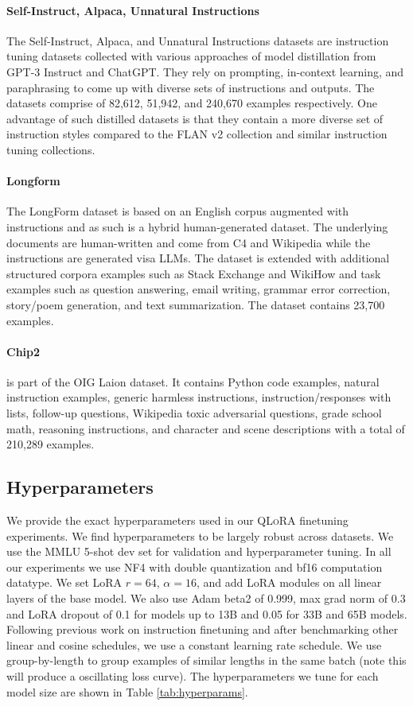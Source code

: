 \documentclass{article}
\newcommand{\method}{\textsc{QLoRA}\xspace}
\newcommand{\doublequant}{double quantization\xspace}
\begin{document}
\paragraph{Self-Instruct, Alpaca, Unnatural Instructions} The Self-Instruct, Alpaca, and Unnatural Instructions  datasets \citep{wang2022self, alpaca, honovich2022unnatural} are instruction tuning datasets collected with various approaches of model distillation from GPT-3 Instruct and ChatGPT. They rely on prompting, in-context learning, and paraphrasing to come up with diverse sets of instructions and outputs. The datasets comprise of 82,612, 51,942, and 240,670 examples respectively. One advantage of such distilled datasets is that they contain a more diverse set of instruction styles compared to the FLAN v2 collection and similar instruction tuning collections.
\paragraph{Longform} 
The LongForm dataset \citep{koksal2023longform} is based on an English corpus augmented with instructions and as such is a hybrid human-generated dataset.
The underlying documents are human-written and come from C4 and Wikipedia while the instructions are generated visa LLMs.
The dataset is extended with additional structured corpora examples such as Stack Exchange and WikiHow and task examples such as question answering, email writing, grammar error correction, story/poem generation, and text summarization. The dataset contains 23,700 examples.
\paragraph{Chip2} is part of the OIG Laion dataset. It contains Python code examples, natural instruction examples, generic harmless instructions, instruction/responses with lists, follow-up questions, Wikipedia toxic adversarial questions, grade school math, reasoning instructions, and character and scene descriptions with a total of 210,289 examples.

\subsection{Hyperparameters}
We provide the exact hyperparameters used in our \method finetuning experiments. We find hyperparameters to be largely robust across datasets. We use the MMLU 5-shot dev set for validation and hyperparameter tuning.
In all our experiments we use NF4 with \doublequant and bf16 computation datatype. We set LoRA $r=64$, $\alpha=16$, and add LoRA modules on all linear layers of the base model. We also use Adam beta2 of 0.999, max grad norm of 0.3 and LoRA dropout of 0.1 for models up to 13B and 0.05 for 33B and 65B models. Following previous work on instruction finetuning \citep{wei2021finetuned, supernaturalinstructions} and after benchmarking other linear and cosine schedules, we use a constant learning rate schedule. We use group-by-length to group  examples of similar lengths in the same batch (note this will produce a oscillating loss curve). The hyperparameters we tune for each model size are shown in Table \ref{tab:hyperparams}.
\end{document}
